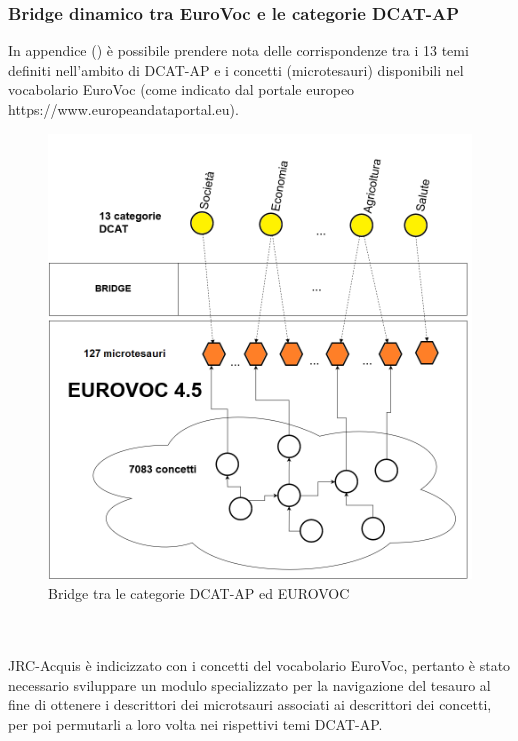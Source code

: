 \documentclass{article}
\theoremstyle{plain}
\theoremstyle{definition}
\begin{document}
\subsubsection{Bridge dinamico tra EuroVoc e le categorie DCAT-AP}
In appendice () è possibile prendere nota delle corrispondenze tra i 13 temi definiti nell'ambito di DCAT-AP e i concetti (microtesauri) disponibili nel vocabolario EuroVoc (come indicato dal portale europeo https://www.europeandataportal.eu).
\begin{figure}[htbp]
\begin{center}
\includegraphics[scale=0.50]{img/eurovocdcat.png}
\caption{Bridge tra le categorie DCAT-AP ed EUROVOC}
\end{center}
\end{figure}
\\
\\
JRC-Acquis è indicizzato con i concetti del vocabolario EuroVoc, pertanto è stato necessario sviluppare un modulo specializzato per la navigazione del tesauro al fine di ottenere i descrittori dei microtsauri associati ai descrittori dei concetti, per poi permutarli a loro volta nei rispettivi temi DCAT-AP. 
\end{document}
